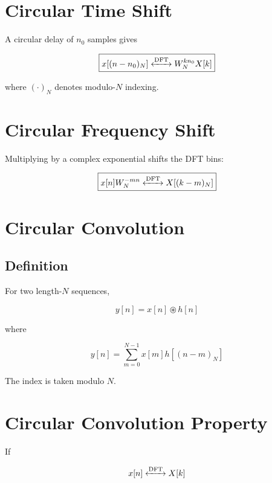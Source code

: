 \section{Circular Time Shift}

A circular delay of \(n_0\) samples gives

\[
\boxed{
x[(n-n_0)_N]
\xleftrightarrow{\text{DFT}}
W_N^{kn_0}X[k]
}
\]

where \((\cdot)_N\) denotes modulo-\(N\) indexing.


\section{Circular Frequency Shift}

Multiplying by a complex exponential shifts the DFT bins:

\[
\boxed{
x[n]W_N^{-mn}
\xleftrightarrow{\text{DFT}}
X[(k-m)_N]
}
\]


\section{Circular Convolution}


\subsection{Definition}

For two length-\(N\) sequences,

\[
\boxed{
y[n]=x[n]\circledast h[n]
}
\]

where

\[
\boxed{
y[n]=
\sum_{m=0}^{N-1}
x[m]h[(n-m)_N]
}
\]

The index is taken modulo \(N\).


\section{Circular Convolution Property}

If

\[
x[n]\xleftrightarrow{\text{DFT}}X[k]
\]

